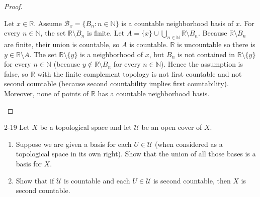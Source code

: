 \begin{proof}
\begin{enumerate}[label={(\alph*)}]
		      Let $x\in\mathbb{R}$. Assume $\mathscr{B}_{x} = \{ B_{n} : n\in\mathbb{N} \}$ is a countable neighborhood basis of $x$. For every $n\in\mathbb{N}$, the set $\mathbb{R}\setminus B_{n}$ is finite. Let $A = \{ x \}\cup \bigcup_{n\in\mathbb{N}}\mathbb{R}\setminus B_{n}$. Because $\mathbb{R}\setminus B_{n}$ are finite, their union is countable, so $A$ is countable. $\mathbb{R}$ is uncountable so there is $y\in\mathbb{R}\setminus A$. The set $\mathbb{R}\setminus\{y\}$ is a neighborhood of $x$, but $B_{n}$ is not contained in $\mathbb{R}\setminus\{y\}$ for every $n\in\mathbb{N}$ (because $y\notin \mathbb{R}\setminus B_{n}$ for every $n\in\mathbb{N}$). Hence the assumption is false, so $\mathbb{R}$ with the finite complement topology is not first countable and not second countable (because second countability implies first countability). Moreover, none of points of $\mathbb{R}$ has a countable neighborhood basis.
	\end{enumerate}
\end{proof}

\begin{problem}{2-19}\label{problem:2-19}
Let $X$ be a topological space and let $\mathscr{U}$ be an open cover of $X$.
\begin{enumerate}[label={(\alph*)}]
	\item Suppose we are given a basis for each $U\in\mathscr{U}$ (when considered as a topological space in its own right). Show that the union of all those bases is a basis for $X$.
	\item Show that if $\mathscr{U}$ is countable and each $U\in\mathscr{U}$ is second countable, then $X$ is second countable.
\end{enumerate}
\end{problem}

